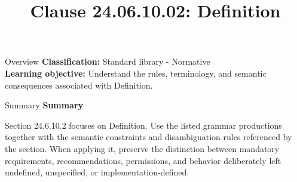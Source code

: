 \documentclass[10pt,letterpaper]{article}
\title{Clause 24.06.10.02: Definition}
\author{}
\date{}
\begin{document}
\maketitle
\begin{CornellOverviewBox}{Overview}
\textbf{Classification:} Standard library - Normative\\[2pt]
\textbf{Learning objective:} Understand the rules, terminology, and semantic consequences associated with Definition.
\end{CornellOverviewBox}\begin{CornellSummaryBox}{Summary}
{\sffamily\bfseries\color{Accent} Summary}\par\vspace{3pt}Section 24.6.10.2 focuses on Definition. Use the listed grammar productions together with the semantic constraints and disambiguation rules referenced by the section. When applying it, preserve the distinction between mandatory requirements, recommendations, permissions, and behavior deliberately left undefined, unspecified, or implementation-defined.
\end{CornellSummaryBox}
\end{document}
